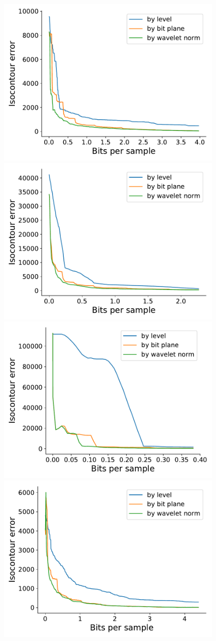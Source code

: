 \begin{figure}
  \centering
  {\includegraphics[width=0.48\linewidth]{img/motivation/motivation-isocontour-boiler.pdf}}
 	{\includegraphics[width=0.48\linewidth]{img/motivation/motivation-isocontour-diffusivity.pdf}}
 	{\includegraphics[width=0.48\linewidth]{img/motivation/motivation-isocontour-euler.pdf}}
 	{\includegraphics[width=0.48\linewidth]{img/motivation/motivation-isocontour-turbulence.pdf}}

\end{figure}
